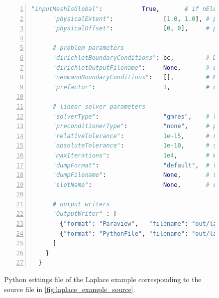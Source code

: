 \begin{figure}
\begin{framed}
\begin{lstlisting}[basicstyle=\footnotesize\ttfamily,language=Python,commentstyle=\color{gray},numbers=left]
      "inputMeshIsGlobal":           True,       # if nElements is a global number$\label{code:c1l26}$
      "physicalExtent":              [1.0, 1.0], # physical domain size           $\label{code:c1l27}$
      "physicalOffset":              [0, 0],     # physical location of origin    $\label{code:c1l28}$
                                                                                  $\label{code:c1l29}$
      # problem parameters                                                        $\label{code:c1l30}$
      "dirichletBoundaryConditions": bc,         # Dirichlet BC as dict           $\label{code:c1l31}$
      "dirichletOutputFilename":     None,       # output file for Dirichlet BC   $\label{code:c1l32}$
      "neumannBoundaryConditions":   [],         # Neumann BC                     $\label{code:c1l33}$
      "prefactor":                   1,          # constant prefactor c in $\textcolor{gray}{c\Delta u}$   $\label{code:c1l34}$
                                                                                  $\label{code:c1l35}$
      # linear solver parameters                                                         $\label{code:c1l36}$
      "solverType":                  "gmres",    # linear solver scheme           $\label{code:c1l37}$
      "preconditionerType":          "none",     # preconditioner scheme          $\label{code:c1l38}$
      "relativeTolerance":           1e-15,      # stopping criterion, rel. tol.  $\label{code:c1l39}$
      "absoluteTolerance":           1e-10,      # stopping criterion, abs. tol.  $\label{code:c1l40}$
      "maxIterations":               1e4,        # maximum number of iterations   $\label{code:c1l41}$
      "dumpFormat":                  "default",  # format for data dump           $\label{code:c1l42}$
      "dumpFilename":                None,       # filename for dump              $\label{code:c1l43}$
      "slotName":                    None,       # connector of solver            $\label{code:c1l44}$
                                                                                  $\label{code:c1l45}$
      # output writers                                                            $\label{code:c1l46}$
      "OutputWriter" : [                                                          $\label{code:c1l47}$
        {"format": "Paraview",   "filename": "out/laplace", "binary": False},     $\label{code:c1l48}$
        {"format": "PythonFile", "filename": "out/laplace", "binary": False},     $\label{code:c1l49}$
      ]                                                                           $\label{code:c1l50}$
    }                                                                             $\label{code:c1l51}$
  }                                                                               $\label{code:c1l52}$
\end{lstlisting}
\end{framed}
\caption{Python settings file of the Laplace example corresponding to the source file in \cref{fig:laplace_example_source}.}%
\label{fig:laplace_example_settings}%
\end{figure}

